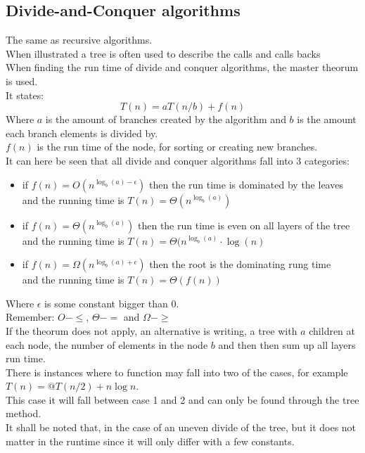 \documentclass[12pt, a4paper]{article}
\begin{document}
			\subsection{Divide-and-Conquer algorithms}
				The same as recursive algorithms.\\
				When illustrated a tree is often used to describe the calls and calls backs\\
				When finding the run time of divide and conquer algorithms, the master theorum is used.\\
				It states:
				$$T(n)=aT(n/b)+f(n)$$
				Where $a$ is the amount of branches created by the algorithm and $b$ is the amount each branch elements is divided by.\\
				$f(n)$ is the run time of the node, for sorting or creating new branches.\\
				It can here be seen that all divide and conquer algorithms fall into 3 categories:
				\begin{itemize}
					\item if $f(n)=O(n^{\log_b(a)-\epsilon})$ then the run time is dominated by the leaves\\
							  and the running time is $T(n)=\Theta(n^{\log_b(a)})$
					\item if $f(n)=\Theta(n^{\log_b(a)})$ then the run time is even on all layers of the tree\\
						and the running time is $T(n)=\Theta(n^{\log_b(a)}\cdot \log(n)$
			 		\item if $f(n)=\Omega(n^{\log_b(a)+\epsilon})$ then the root is the dominating rung time\\
							  and the running time is $T(n)=\Theta(f(n))$
				\end{itemize}
				Where $\epsilon$ is some constant bigger than 0.\\
				Remember: $O - \leq$, $\Theta - =$ and $\Omega - \geq$\\
				If the theorum does not apply, an alternative is writing, a tree with $a$ children at each node, the number of elements in the node $b$ and then then sum up all layers run time.\\[4mm]
				There is instances where to function may fall into two of the cases, for example $T(n)=@T(n/2)+n\log n$.\\
				This case it will fall between case 1 and 2 and can only be found through the tree method.\\
				It shall be noted that, in the case of an uneven divide of the tree, but it does not matter in the runtime since it will only differ with a few constants.
\end{document}
